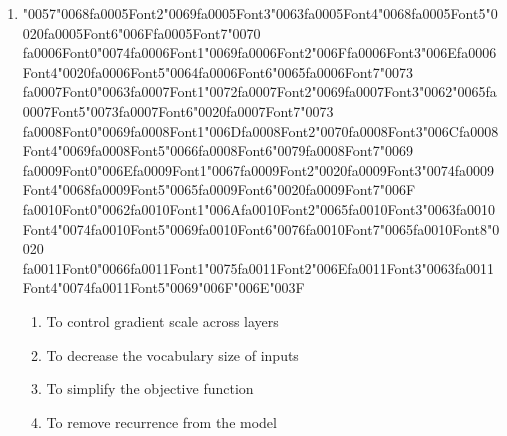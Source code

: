 \documentclass[12pt]{article}
\begin{document}
\begin{enumerate}[label=Q\arabic*.]
 \item {\char"0057}{\char"0068}{\csname fa0005Font2\endcsname\char"0069}{\csname fa0005Font3\endcsname\char"0063}{\csname fa0005Font4\endcsname\char"0068}{\csname fa0005Font5\endcsname\char"0020}{\csname fa0005Font6\endcsname\char"006F}{\csname fa0005Font7\endcsname\char"0070} {\csname fa0006Font0\endcsname\char"0074}{\csname fa0006Font1\endcsname\char"0069}{\csname fa0006Font2\endcsname\char"006F}{\csname fa0006Font3\endcsname\char"006E}{\csname fa0006Font4\endcsname\char"0020}{\csname fa0006Font5\endcsname\char"0064}{\csname fa0006Font6\endcsname\char"0065}{\csname fa0006Font7\endcsname\char"0073} {\csname fa0007Font0\endcsname\char"0063}{\csname fa0007Font1\endcsname\char"0072}{\csname fa0007Font2\endcsname\char"0069}{\csname fa0007Font3\endcsname\char"0062}{\char"0065}{\csname fa0007Font5\endcsname\char"0073}{\csname fa0007Font6\endcsname\char"0020}{\csname fa0007Font7\endcsname\char"0073} {\csname fa0008Font0\endcsname\char"0069}{\csname fa0008Font1\endcsname\char"006D}{\csname fa0008Font2\endcsname\char"0070}{\csname fa0008Font3\endcsname\char"006C}{\csname fa0008Font4\endcsname\char"0069}{\csname fa0008Font5\endcsname\char"0066}{\csname fa0008Font6\endcsname\char"0079}{\csname fa0008Font7\endcsname\char"0069} {\csname fa0009Font0\endcsname\char"006E}{\csname fa0009Font1\endcsname\char"0067}{\csname fa0009Font2\endcsname\char"0020}{\csname fa0009Font3\endcsname\char"0074}{\csname fa0009Font4\endcsname\char"0068}{\csname fa0009Font5\endcsname\char"0065}{\csname fa0009Font6\endcsname\char"0020}{\csname fa0009Font7\endcsname\char"006F} {\csname fa0010Font0\endcsname\char"0062}{\csname fa0010Font1\endcsname\char"006A}{\csname fa0010Font2\endcsname\char"0065}{\csname fa0010Font3\endcsname\char"0063}{\csname fa0010Font4\endcsname\char"0074}{\csname fa0010Font5\endcsname\char"0069}{\csname fa0010Font6\endcsname\char"0076}{\csname fa0010Font7\endcsname\char"0065}{\csname fa0010Font8\endcsname\char"0020} {\csname fa0011Font0\endcsname\char"0066}{\csname fa0011Font1\endcsname\char"0075}{\csname fa0011Font2\endcsname\char"006E}{\csname fa0011Font3\endcsname\char"0063}{\csname fa0011Font4\endcsname\char"0074}{\csname fa0011Font5\endcsname\char"0069}{\char"006F}{\char"006E}{\char"003F}
 \begin{enumerate}[label=(\Alph*)]
     \item To control gradient scale across layers
     \item To decrease the vocabulary size of inputs
     \item To simplify the objective function
     \item To remove recurrence from the model
 \end{enumerate}
 

\end{enumerate}
\end{document}
